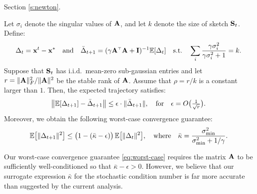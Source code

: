 \documentclass[../../thesis.tex]{subfiles}
\begin{document}
Section \ref{s:newton}.
\begin{corollary}\label{c:kaczmarz2}
  Let $\sigma_i$ denote the singular values of $\A$, and let $k$ denote
  the size of sketch $\S_t$. Define:
  \begin{align*}
    \Delta_t=\x^t-\x^*\quad\text{and}\quad  \bar\Delta_{t+1} =
    (\gamma\A^\top\A+\I)^{-1}\E[\Delta_t]\quad\text{s.t.}\quad
    \sum_i\frac{\gamma\sigma_i^2}{\gamma\sigma_i^2+1}=k.
  \end{align*}
  Suppose that $\S_t$ has i.i.d.~mean-zero sub-gaussian entries and let
  $r=\|\A\|_F^2/\|\A\|^2$ be the stable rank of $\A$.
  Assume that $\rho = r/k$ is a constant larger than $1$. Then, the
  expected trajectory satisfies:
  \begin{align}
    \big\|\E[\Delta_{t+1}] - \bar\Delta_{t+1}\big\|
    \leq \epsilon\cdot \|\bar\Delta_{t+1}\|,
    \quad\text{for}\quad\epsilon=O\big(\tfrac1{\sqrt
      r}\big).\label{eq:trajectory}
  \end{align}
  Moreover, we obtain the following worst-case convergence guarantee:
  \begin{align}
    \E\big[\|\Delta_{t+1}\|^2\big]
    \leq \big(1-
    (\bar\kappa-\epsilon)\big)\,\E\big[\|\Delta_t\|^2\big],
    \quad\text{where}\quad
    \bar\kappa = \frac{\sigma_{\min}^2}{\sigma_{\min}^2+1/\gamma}.\label{eq:worst-case}
  \end{align}
\end{corollary}
\begin{remark}
  Our worst-case convergence guarantee \eqref{eq:worst-case}
  requires the matrix $\A$ to be sufficiently well-conditioned so
  that $\bar\kappa-\epsilon>0$. However, we believe that our surrogate expression
  $\bar\kappa$ for the stochastic condition number is far more
  accurate than suggested by the current analysis.
\end{remark}
\end{document}
